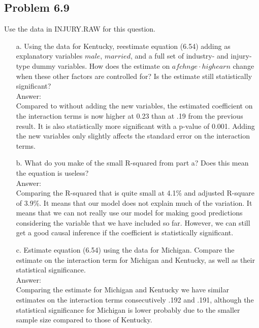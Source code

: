 \documentclass[10pt]{article}
\begin{document}
\subsection*{Problem 6.9}
Use the data in INJURY.RAW for this question. 
\begin{enumerate}
\item[a.] Using the data for Kentucky, reestimate equation (6.54) adding as explanatory variables $male$, $married$, and a full set of industry- and injury-type dummy variables. How does the estimate on $afchnge\cdot highearn$ change when these other factors are controlled for? Is the estimate still statistically significant? 
\\ Answer: \\

Compared to without adding the new variables, the estimated coefficient on the interaction terms is now higher at 0.23 than at .19 from the previous result. It is also statistically more significant with a p-value of 0.001. Adding the new variables only slightly affects the standard error on the interaction terms. 

\item[b.] What do you make of the small R-squared from part a? Does this mean the equation is useless? 
\\ Answer: \\
Comparing the R-squared that is quite small at 4.1\% and adjusted R-square of 3.9\%. It means that our model does not explain much of the variation. It means that we can not really use our model for making good predictions considering the variable that we have included so far. However, we can still get a good causal inference if the coefficient is statistically significant.

\item[c.] Estimate equation (6.54) using the data for Michigan. Compare the estimate on the interaction term for Michigan and Kentucky, as well as their statistical significance.
\\ Answer: \\

Comparing the estimate for Michigan and Kentucky we have similar estimates on the interaction terms consecutively .192 and .191, although the statistical significance for Michigan is lower probably due to the smaller sample size compared to those of Kentucky.

\end{enumerate}
\end{document}
